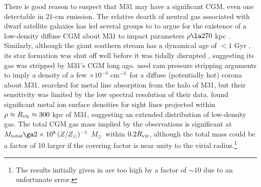 \documentclass[12pt,preprint]{aastex6}
\newcommand{\Rvir}{\ensuremath{R_{\rm vir}}\relax}
\newcommand{\msun}{\ensuremath{M_\odot}\relax}
\newcommand{\percc}{cm$^{-3}$}
\begin{document}
There is good reason to suspect that M31 may have a significant CGM,
even one detectable in 21-cm emission. The relative dearth of neutral
gas associated with dwarf satellite galaxies has led several groups to
to argue for the existence of a low-density diffuse CGM about M31 to
impact parameters $\rho \la 270$ kpc \citep[][ see also
\citealt{spekkens2014} for similar work specific to the Milky
Way]{blitz2000, grcevich2009}. Similarly, although the giant southern
stream has a dynamical age of $<1$ Gyr \citep{fardal2008}, its star
formation was shut off well before it was tidally disrupted
\citep[$\ga 4$ Gyr ago;][]{brown2006}, suggesting its gas was stripped
by M31's CGM long ago. \citeauthor{grcevich2009} used ram pressure
stripping arguments to imply a density of a few $\times10^{-4}$
\percc\ for a diffuse (potentially hot) corona about M31.
\citet{rao2013} searched for metal line absorption from the halo of
M31, but their sensitivity was limited by the low spectral resolution
of their data.  found significant metal ion
surface densities for sight lines projected within
$\rho \approx \Rvir \approx 300$ kpc of M31, suggesting an extended
distribution of low-density gas.  The total CGM gas mass implied by
the  observations is significant at
$M_{\rm total} \ga 2\times10^8\, (Z/Z_\odot)^{-1}$ \msun\ within
$0.2\Rvir$, although the total mass could be a factor of 10 larger if
the covering factor is near unity to the virial radius.\footnote{The
  results initially given in  are too high by a
  factor of $\sim10$ due to an unfortunate error.}
\end{document}
